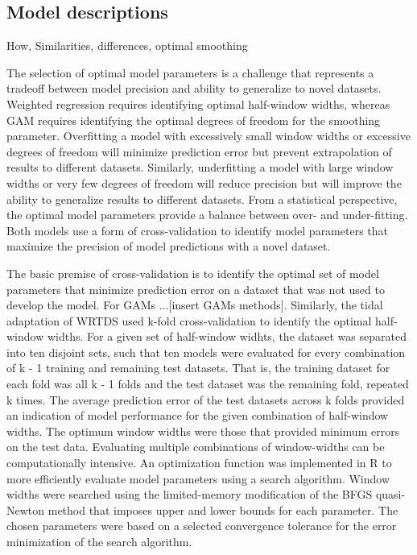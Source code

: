 \documentclass[letterpaper,12pt,oneside]{article}\usepackage[]{graphicx}\usepackage[]{color}
\begin{document}
\subsection{Model descriptions}

How, Similarities, differences, optimal smoothing

The selection of optimal model parameters is a challenge that represents a tradeoff between model precision and ability to generalize to novel datasets.  Weighted regression requires identifying optimal half-window widths, whereas \ac{GAM} requires identifying the optimal degrees of freedom for the smoothing parameter.  Overfitting a model with excessively small window widths or excessive degrees of freedom will minimize prediction error but prevent extrapolation of results to different datasets. Similarly, underfitting a model with large window widths or very few degrees of freedom will reduce precision but will improve the ability to generalize results to different datasets. From a statistical perspective, the optimal model parameters provide a balance between over- and under-fitting.  Both models use a form of cross-validation to identify model parameters that maximize the precision of model predictions with a novel dataset.   

The basic premise of cross-validation is to identify the optimal set of model parameters that minimize prediction error on a dataset that was not used to develop the model.  For \acp{GAM} \citep{Hastie90,Zuur12}...[insert GAMs methods]. Similarly, the tidal adaptation of \ac{WRTDS} used k-fold cross-validation to identify the optimal half-window widths. For a given set of half-window widhts, the dataset was separated into ten disjoint sets, such that ten models were evaluated for every combination of k - 1 training and remaining test datasets. That is, the training dataset for each fold was all k - 1 folds and the test dataset was the remaining fold, repeated k times. The average prediction error of the test datasets across k folds provided an indication of model performance for the given combination of half-window widths.  The optimum window widths were those that provided minimum errors on the test data.  Evaluating multiple combinations of window-widths can be computationally intensive. An optimization function was implemented in R  \citep{Byrd95,RDCT15} to more efficiently evaluate model parameters using a search algorithm.  Window widths were searched using the limited-memory modification of the BFGS quasi-Newton method that imposes upper and lower bounds for each parameter.  The chosen parameters were based on a selected convergence tolerance for the error minimization of the search algorithm.  
\end{document}
